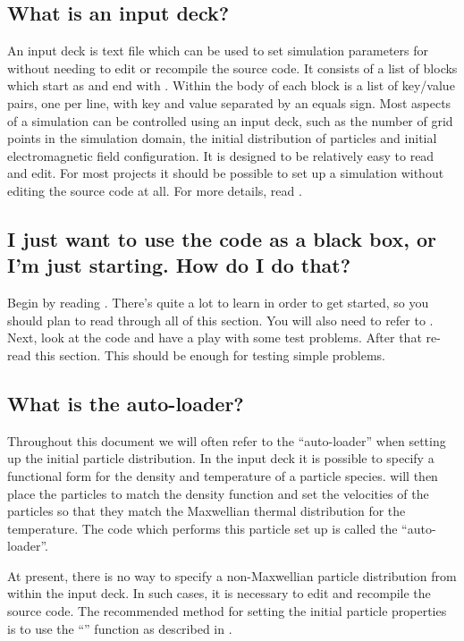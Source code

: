 \subsection{What is an input deck?}
An input deck is text file which can be used to set simulation parameters
for {\EPOCH} without needing to edit or recompile the source code.
It consists of a list of blocks which start as 
and end with . Within the body of each block is
a list of key/value pairs, one per line, with key and value separated by
an equals sign. Most aspects of a simulation can be controlled using an
input deck, such as the number of grid points in the simulation domain,
the initial distribution of particles and initial electromagnetic field
configuration. It is designed to be relatively easy to read and edit. For
most projects it should be possible to set up a simulation without
editing the source code at all.
For more details, read .

\subsection{I just want to use the code as a black box, or I'm just
  starting. How do I do that?}
Begin by reading . There's quite a lot to learn in order to
get started, so you should plan to read through all of this section. You will
also need to refer to . Next, look at the code and have
a play with some test problems. After that re-read this section. This should be
enough for testing simple problems.


\subsection{What is the auto-loader?}
Throughout this document we will often refer to the ``auto-loader'' when
setting up the initial particle distribution. In the input deck it is
possible to specify a functional form for the density and temperature
of a particle species. {\EPOCH} will then place the particles to match
the density function and set the velocities of the particles so that they
match the Maxwellian thermal distribution for the temperature.
The code which performs this particle set up is called the ``auto-loader''.

At present, there is no way to specify a non-Maxwellian particle distribution
from within the input deck. In such cases, it is necessary to edit and
recompile the {\EPOCH} source code. The recommended method for setting
the initial particle properties is to use the ``'' function
as described in .

